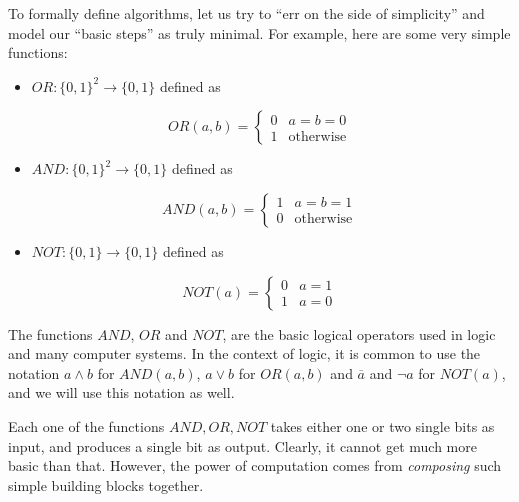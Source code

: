 To formally define algorithms, let us try to ``err on the side of
simplicity'' and model our ``basic steps'' as truly minimal. For
example, here are some very simple functions:

\begin{itemize}
\tightlist
\item
  \(\ensuremath{\mathit{OR}}:\{0,1\}^2 \rightarrow \{0,1\}\) defined as
\end{itemize}

\[\ensuremath{\mathit{OR}}(a,b) = \begin{cases} 0 & a=b=0 \\ 1 & \text{otherwise} \end{cases}\]

\begin{itemize}
\tightlist
\item
  \(\ensuremath{\mathit{AND}}:\{0,1\}^2 \rightarrow \{0,1\}\) defined as
\end{itemize}

\[\ensuremath{\mathit{AND}}(a,b) = \begin{cases} 1 & a=b=1 \\ 0 & \text{otherwise} \end{cases}\]

\begin{itemize}
\tightlist
\item
  \(\ensuremath{\mathit{NOT}}:\{0,1\} \rightarrow \{0,1\}\) defined as
\end{itemize}

\[\ensuremath{\mathit{NOT}}(a) = \begin{cases} 0 & a = 1 \\ 1 & a = 0 \end{cases}\]

The functions \(\ensuremath{\mathit{AND}}\),
\(\ensuremath{\mathit{OR}}\) and \(\ensuremath{\mathit{NOT}}\), are the
basic logical operators used in logic and many computer systems. In the
context of logic, it is common to use the notation \(a \wedge b\) for
\(\ensuremath{\mathit{AND}}(a,b)\), \(a \vee b\) for
\(\ensuremath{\mathit{OR}}(a,b)\) and \(\overline{a}\) and \(\neg a\)
for \(\ensuremath{\mathit{NOT}}(a)\), and we will use this notation as
well.

Each one of the functions
\(\ensuremath{\mathit{AND}},\ensuremath{\mathit{OR}},\ensuremath{\mathit{NOT}}\)
takes either one or two single bits as input, and produces a single bit
as output. Clearly, it cannot get much more basic than that. However,
the power of computation comes from \emph{composing} such simple
building blocks together.

